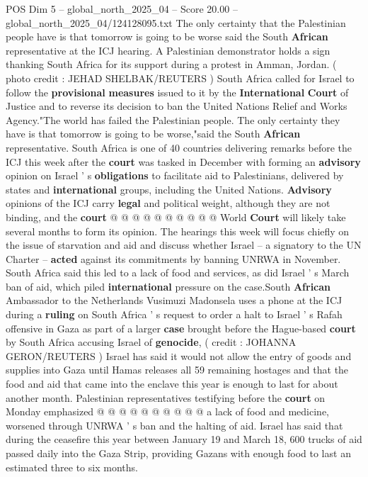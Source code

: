 \begin{textsample}{POS Dim 5 – global\_north\_2025\_04 – Score 20.00 – global\_north\_2025\_04/124128095.txt}  \label{ex:f5_pos_091}
The only certainty that the Palestinian people have is that tomorrow is going to be worse said the South \textbf{African} representative at the ICJ hearing.
A Palestinian demonstrator holds a sign thanking South Africa for its support during a protest in Amman, Jordan. ( photo credit : JEHAD SHELBAK/REUTERS ) South Africa called for Israel to follow the \textbf{provisional} \textbf{measures} issued to it by the \textbf{International} \textbf{Court} of Justice and to reverse its decision to ban the United Nations Relief and Works Agency."The world has failed the Palestinian people.
The only certainty they have is that tomorrow is going to be worse,"said the South \textbf{African} representative.
South Africa is one of 40 countries delivering remarks before the ICJ this week after the \textbf{court} was tasked in December with forming an \textbf{advisory} opinion on Israel ' s \textbf{obligations} to facilitate aid to Palestinians, delivered by states and \textbf{international} groups, including the United Nations. \textbf{Advisory} opinions of the ICJ carry \textbf{legal} and political weight, although they are not binding, and the \textbf{court} @ @ @ @ @ @ @ @ @ @ World \textbf{Court} will likely take several months to form its opinion.
The hearings this week will focus chiefly on the issue of starvation and aid and discuss whether Israel -- a signatory to the UN Charter -- \textbf{acted} against its commitments by banning UNRWA in November.
South Africa said this led to a lack of food and services, as did Israel ' s March ban of aid, which piled \textbf{international} pressure on the case.South \textbf{African} Ambassador to the Netherlands Vusimuzi Madonsela uses a phone at the ICJ during a \textbf{ruling} on South Africa ' s request to order a halt to Israel ' s Rafah offensive in Gaza as part of a larger \textbf{case} brought before the Hague-based \textbf{court} by South Africa accusing Israel of \textbf{genocide}, ( credit : JOHANNA GERON/REUTERS ) Israel has said it would not allow the entry of goods and supplies into Gaza until Hamas releases all 59 remaining hostages and that the food and aid that came into the enclave this year is enough to last for about another month.
Palestinian representatives testifying before the \textbf{court} on Monday emphasized @ @ @ @ @ @ @ @ @ @ a lack of food and medicine, worsened through UNRWA ' s ban and the halting of aid.
Israel has said that during the ceasefire this year between January 19 and March 18, 600 trucks of aid passed daily into the Gaza Strip, providing Gazans with enough food to last an estimated three to six months.

\end{textsample}
